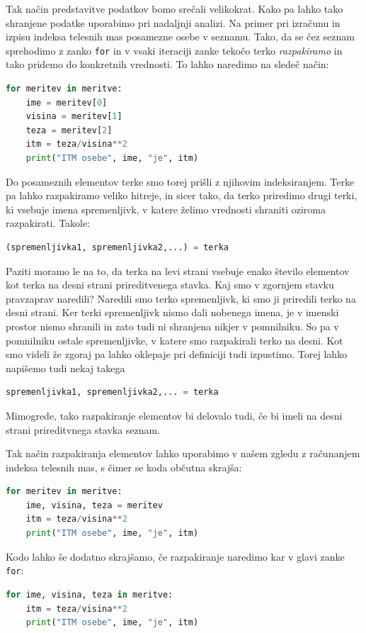 Tak način predstavitve podatkov bomo srečali velikokrat. Kako pa lahko tako shranjene podatke uporabimo pri nadaljnji analizi. Na primer pri izračunu in izpisu indeksa telesnih mas posamezne osebe v seznamu. Tako, da se čez seznam sprehodimo z zanko \texttt{for} in v vsaki iteraciji zanke tekočo terko \emph{razpakiramo} in tako pridemo do konkretnih vrednosti. To lahko naredimo na sledeč način: 
\begin{lstlisting}[language=Python]
for meritev in meritve:
    ime = meritev[0]
    visina = meritev[1]
    teza = meritev[2]
    itm = teza/visina**2
    print("ITM osebe", ime, "je", itm)
\end{lstlisting}
Do posameznih elementov terke smo torej prišli z njihovim indeksiranjem. Terke pa lahko razpakiramo veliko hitreje, in sicer tako, da terko priredimo drugi terki, ki vsebuje imena spremenljivk, v katere želimo vrednosti shraniti oziroma razpakirati. Takole:
\begin{lstlisting}[language=Python]
(spremenljivka1, spremenljivka2,...) = terka
\end{lstlisting}
Paziti moramo le na to, da terka na levi strani vsebuje enako število elementov kot terka na desni strani prireditvenega stavka. Kaj smo v zgornjem stavku pravzaprav naredili? Naredili smo terko spremenljivk, ki smo ji priredili terko na desni strani. Ker terki spremenljivk nismo dali nobenega imena, je v imenski prostor nismo shranili in zato tudi ni shranjena nikjer v pomnilniku. So pa v pomnilniku ostale spremenljivke, v katere smo razpakirali terko na desni. Kot smo videli že zgoraj pa lahko oklepaje pri definiciji tudi izpustimo. Torej lahko napišemo tudi nekaj takega
\begin{lstlisting}[language=Python]
spremenljivka1, spremenljivka2,... = terka
\end{lstlisting}
Mimogrede, tako razpakiranje elementov bi delovalo tudi, če bi imeli na desni strani prireditvnega stavka seznam.

Tak način razpakiranja elementov lahko uporabimo v našem zgledu z računanjem indeksa telesnih mas, s čimer se koda občutna skrajša:
\begin{lstlisting}[language=Python]
for meritev in meritve:
    ime, visina, teza = meritev
    itm = teza/visina**2
    print("ITM osebe", ime, "je", itm)
\end{lstlisting}
Kodo lahko še dodatno skrajšamo, če razpakiranje naredimo kar v glavi zanke \texttt{for}:
\begin{lstlisting}[language=Python]
for ime, visina, teza in meritve:
    itm = teza/visina**2
    print("ITM osebe", ime, "je", itm)
\end{lstlisting}

